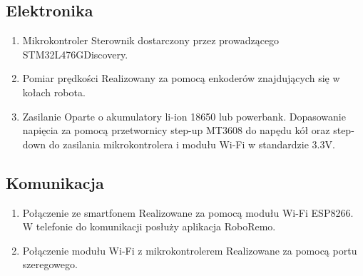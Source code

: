 \documentclass[10pt, a4paper]{article}
\begin{document}
	\subsection{Elektronika}
	\begin{enumerate}
		\item Mikrokontroler
		\newline
		Sterownik dostarczony przez prowadzącego STM32L476GDiscovery.
		
		\item Pomiar prędkości
		\newline
		Realizowany za pomocą enkoderów znajdujących się w kołach robota.
		
		\item Zasilanie
		\newline
		Oparte o akumulatory li-ion 18650 lub powerbank. Dopasowanie napięcia za pomocą przetwornicy step-up MT3608 do napędu kół oraz step-down do zasilania mikrokontrolera i modułu Wi-Fi w standardzie 3.3V.
	\end{enumerate}

	\subsection{Komunikacja}
	\begin{enumerate}
		\item Połączenie ze smartfonem
		\newline
		Realizowane za pomocą modułu Wi-Fi ESP8266. W telefonie do komunikacji posłuży aplikacja RoboRemo.
		\item Połączenie modułu Wi-Fi z mikrokontrolerem
		\newline
		Realizowane za pomocą portu szeregowego.
	\end{enumerate}
	
\end{document}
